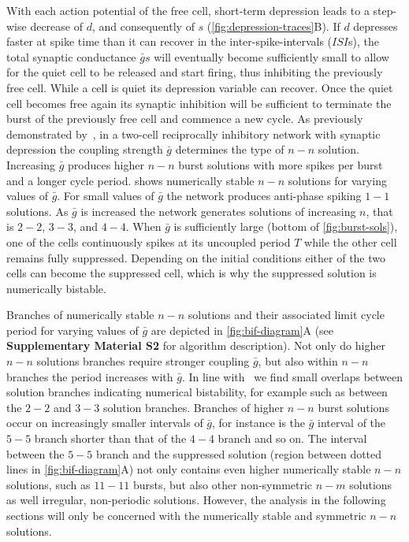 \documentclass[utf8]{frontiersFPHY} %
\newcommand{\gbar}{\bar g}
\begin{document}
With each action potential of the free cell, short-term depression leads to a step-wise decrease of $d$, and consequently of $s$ (\cref{fig:depression-traces}B).
If $d$ depresses faster at spike time than it can recover in the inter-spike-intervals ($ISI$s), the total synaptic conductance $\gbar s$ will eventually become sufficiently small to allow for the quiet cell to be released and start firing, thus inhibiting the previously free cell.
While a cell is quiet its depression variable can recover.
Once the quiet cell becomes free again its synaptic inhibition will be sufficient to terminate the burst of the previously free cell and commence a new cycle.
As previously demonstrated by~\citet{bose2011}, in a two-cell reciprocally inhibitory network with synaptic depression the coupling strength $\gbar$ determines the type of $n-n$ solution.
Increasing $\gbar$ produces higher $n-n$ burst solutions with more spikes per burst and a longer cycle period.
 shows numerically stable $n-n$ solutions for varying values of $\gbar$.
For small values of $\gbar$ the network produces anti-phase spiking $1-1$ solutions.
As $\gbar$ is increased the network generates solutions of increasing $n$, that is $2-2$, $3-3$, and $4-4$.
When $\gbar$ is sufficiently large (bottom of \cref{fig:burst-sols}), one of the cells continuously spikes at its uncoupled period $T$ while the other cell remains fully suppressed.
Depending on the initial conditions either of the two cells can become the suppressed cell, which is why the suppressed solution is numerically bistable.

Branches of numerically stable $n-n$ solutions and their associated limit cycle period for varying values of $\gbar$ are depicted in \cref{fig:bif-diagram}A (see  \textbf{Supplementary Material S2} for algorithm description).
Not only do higher $n-n$ solutions branches require stronger coupling $\gbar$, but also within $n-n$ branches the period increases with $\gbar$.
In line with~\citet{bose2011} we find small overlaps between solution branches indicating numerical bistability, for example such as between the $2-2$ and $3-3$ solution branches.
Branches of higher $n-n$ burst solutions occur on increasingly smaller intervals of $\gbar$, for instance is the $\gbar$ interval of the $5-5$ branch shorter than that of the $4-4$ branch and so on.
The interval between the $5-5$ branch and the suppressed solution (region between dotted lines in \cref{fig:bif-diagram}A) not only contains even higher numerically stable $n-n$ solutions, such as $11-11$ bursts, but also other non-symmetric $n-m$ solutions as well irregular, non-periodic solutions. However, the analysis in the following sections will only be concerned with the numerically stable and symmetric $n-n$ solutions.
\end{document}
